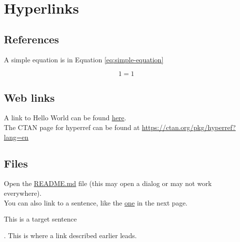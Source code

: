 \section{Hyperlinks}

\subsection{References}

A simple equation is in Equation \ref{eq:simple-equation}

\begin{equation}
    1 = 1
    \label{eq:simple-equation}
\end{equation}

\subsection{Web links}

A link to Hello World can be found \href{https://en.wikipedia.org/wiki/%22Hello,_World!%22_program}{here}.
\\ \noindent
The CTAN page for hyperref can be found at \url{https://ctan.org/pkg/hyperref?lang=en}

\subsection{Files}

Open the \href{run:./README.md}{README.md} file (this may open a dialog or may not work everywhere).
\\ \noindent
You can also link to a sentence, like the \hyperlink{text:last-sentence-1}{one} in the next page. 

\pagebreak

\hypertarget{text:last-sentence-1}{This is a target sentence}. This is where a link described earlier leads.
